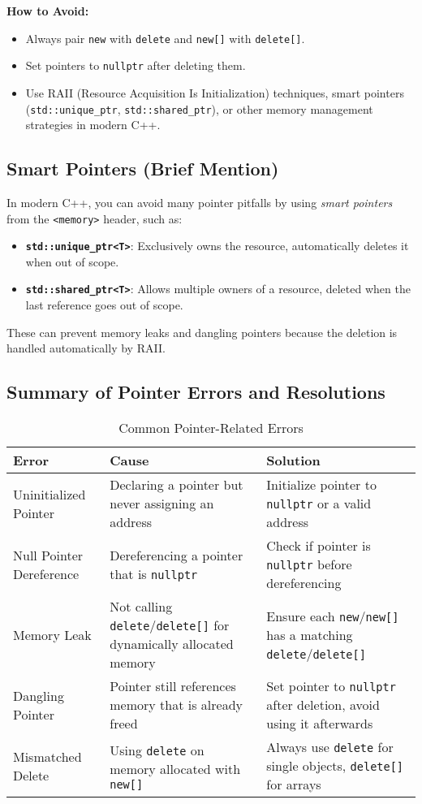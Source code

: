 \documentclass[a4paper,12pt]{article}
\begin{document}
\noindent
\textbf{How to Avoid:}
\begin{itemize}
    \item Always pair \texttt{new} with \texttt{delete} and \texttt{new[]} with \texttt{delete[]}.
    \item Set pointers to \texttt{nullptr} after deleting them.
    \item Use RAII (Resource Acquisition Is Initialization) techniques, smart pointers (\texttt{std::unique\_ptr}, \texttt{std::shared\_ptr}), or other memory management strategies in modern C++.
\end{itemize}

\subsection{Smart Pointers (Brief Mention)}
In modern C++, you can avoid many pointer pitfalls by using \textit{smart pointers} from the \texttt{<memory>} header, such as:
\begin{itemize}
    \item \textbf{\texttt{std::unique\_ptr<T>}}: Exclusively owns the resource, automatically deletes it when out of scope.
    \item \textbf{\texttt{std::shared\_ptr<T>}}: Allows multiple owners of a resource, deleted when the last reference goes out of scope.
\end{itemize}

These can prevent memory leaks and dangling pointers because the deletion is handled automatically by RAII.

\subsection{Summary of Pointer Errors and Resolutions}

\begin{table}[h!]
\centering
\caption{Common Pointer-Related Errors}
\begin{tabular}{|l|p{5cm}|p{5cm}|}
\hline
\textbf{Error} & \textbf{Cause} & \textbf{Solution} \\ \hline
Uninitialized Pointer & Declaring a pointer but never assigning an address & Initialize pointer to \texttt{nullptr} or a valid address \\ \hline
Null Pointer Dereference & Dereferencing a pointer that is \texttt{nullptr} & Check if pointer is \texttt{nullptr} before dereferencing \\ \hline
Memory Leak & Not calling \texttt{delete}/\texttt{delete[]} for dynamically allocated memory & Ensure each \texttt{new}/\texttt{new[]} has a matching \texttt{delete}/\texttt{delete[]} \\ \hline
Dangling Pointer & Pointer still references memory that is already freed & Set pointer to \texttt{nullptr} after deletion, avoid using it afterwards \\ \hline
Mismatched Delete & Using \texttt{delete} on memory allocated with \texttt{new[]} & Always use \texttt{delete} for single objects, \texttt{delete[]} for arrays \\ \hline
\end{tabular}
\end{table}
\end{document}
